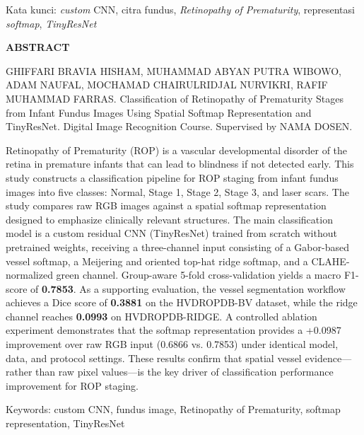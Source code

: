 \vspace{12pt}

\noindent
Kata kunci: \textit{custom} CNN, citra fundus, \textit{Retinopathy of Prematurity},
representasi \textit{softmap}, \textit{TinyResNet}

\vspace{1.5cm}

\begin{center}
{\fontsize{14pt}{17pt}\selectfont\bfseries ABSTRACT}
\end{center}

\vspace{6pt}

\noindent
GHIFFARI BRAVIA HISHAM, MUHAMMAD ABYAN PUTRA WIBOWO, ADAM NAUFAL,
MOCHAMAD CHAIRULRIDJAL NURVIKRI, RAFIF MUHAMMAD FARRAS.
Classification of Retinopathy of Prematurity Stages from Infant Fundus Images
Using Spatial Softmap Representation and TinyResNet.
Digital Image Recognition Course. Supervised by NAMA DOSEN.

\vspace{12pt}

\noindent
Retinopathy of Prematurity (ROP) is a vascular developmental disorder of the retina in
premature infants that can lead to blindness if not detected early. This study constructs a
classification pipeline for ROP staging from infant fundus images into five classes: Normal,
Stage 1, Stage 2, Stage 3, and laser scars. The study compares raw RGB images against a spatial
softmap representation designed to emphasize clinically relevant structures. The main
classification model is a custom residual CNN (TinyResNet) trained from scratch without
pretrained weights, receiving a three-channel input consisting of a Gabor-based vessel softmap,
a Meijering and oriented top-hat ridge softmap, and a CLAHE-normalized green channel. Group-aware
5-fold cross-validation yields a macro F1-score of \textbf{0.7853}. As a supporting evaluation,
the vessel segmentation workflow achieves a Dice score of \textbf{0.3881} on the HVDROPDB-BV
dataset, while the ridge channel reaches \textbf{0.0993} on HVDROPDB-RIDGE. A controlled ablation experiment
demonstrates that the softmap representation provides a +0.0987 improvement over raw RGB input
(0.6866 vs. 0.7853) under identical model, data, and protocol settings. These results confirm
that spatial vessel evidence---rather than raw pixel values---is the key driver of classification
performance improvement for ROP staging.

\vspace{12pt}

\noindent
Keywords: custom CNN, fundus image, Retinopathy of Prematurity, softmap representation,
TinyResNet
